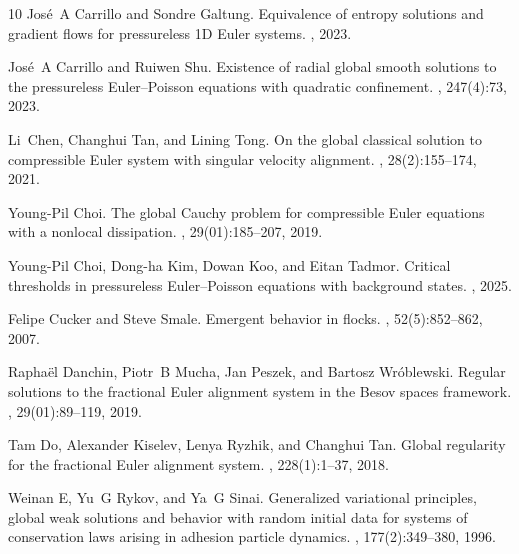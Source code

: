\documentclass[11pt,reqno]{amsart}
\theoremstyle{definition}
\theoremstyle{remark}
\begin{document}
\begin{thebibliography}{10}
		Jos{\'e}~A Carrillo and Sondre Galtung.
		\newblock Equivalence of entropy solutions and gradient flows for pressureless
		{1D} {E}uler systems.
		, 2023.
		
		Jos{\'e}~A Carrillo and Ruiwen Shu.
		\newblock Existence of radial global smooth solutions to the pressureless
		{E}uler--{P}oisson equations with quadratic confinement.
		, 247(4):73, 2023.
		
		Li~Chen, Changhui Tan, and Lining Tong.
		\newblock On the global classical solution to compressible {E}uler system with
		singular velocity alignment.
		, 28(2):155--174, 2021.
		
		Young-Pil Choi.
		\newblock The global {C}auchy problem for compressible {E}uler equations with a
		nonlocal dissipation.
		,
		29(01):185--207, 2019.
		
		Young-Pil Choi, Dong-ha Kim, Dowan Koo, and Eitan Tadmor.
		\newblock Critical thresholds in pressureless {E}uler--{P}oisson equations with
		background states.
		, 2025.
		
		Felipe Cucker and Steve Smale.
		\newblock Emergent behavior in flocks.
		, 52(5):852--862, 2007.
		
		Rapha{\"e}l Danchin, Piotr~B Mucha, Jan Peszek, and Bartosz Wr{\'o}blewski.
		\newblock Regular solutions to the fractional {E}uler alignment system in the
		{B}esov spaces framework.
		,
		29(01):89--119, 2019.
		
		Tam Do, Alexander Kiselev, Lenya Ryzhik, and Changhui Tan.
		\newblock Global regularity for the fractional {E}uler alignment system.
		, 228(1):1--37,
		2018.
		
		Weinan E, Yu~G Rykov, and Ya~G Sinai.
		\newblock Generalized variational principles, global weak solutions and
		behavior with random initial data for systems of conservation laws arising in
		adhesion particle dynamics.
		, 177(2):349--380, 1996.
		

\end{thebibliography}
\end{document}
